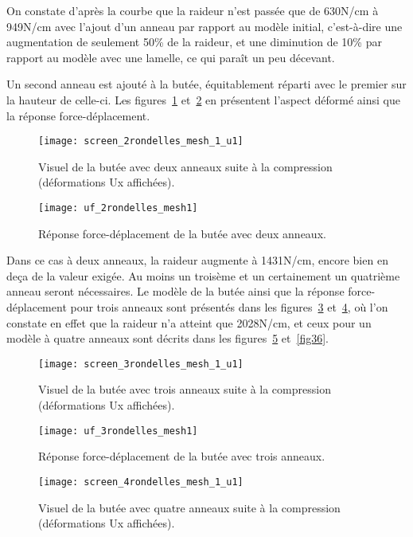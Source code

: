 ﻿\documentclass{article}
\newcommand{\cimg}{0.8}
\begin{document}
On constate d'après la courbe que la raideur n'est passée que de 630N/cm à 949N/cm avec l'ajout d'un anneau par rapport au modèle initial, c'est-à-dire une augmentation de seulement 50\% de la raideur, et une diminution de 10\% par rapport au modèle avec une lamelle, ce qui paraît un peu décevant.

Un second anneau est ajouté à la butée, équitablement réparti avec le premier sur la hauteur de celle-ci. Les figures~\ref{fig31} et~\ref{fig32} en présentent l'aspect déformé ainsi que la réponse force-déplacement.

\begin{figure}[!h]
	\centering
	\texttt{[image: screen\_2rondelles\_mesh\_1\_u1]}
	\caption{Visuel de la butée avec deux anneaux suite à la compression (déformations Ux affichées).}
	\label{fig31}
\end{figure}

\begin{figure}[!h]
	\centering
	\texttt{[image: uf\_2rondelles\_mesh1]}
	\caption{Réponse force-déplacement de la butée avec deux anneaux.}
	\label{fig32}
\end{figure}

Dans ce cas à deux anneaux, la raideur augmente à 1431N/cm, encore bien en deça de la valeur exigée. Au moins un troisème et un certainement un quatrième anneau seront nécessaires. Le modèle de la butée ainsi que la réponse force-déplacement pour trois anneaux sont présentés dans les figures~\ref{fig33} et~\ref{fig34}, où l'on constate en effet que la raideur n'a atteint que 2028N/cm, et ceux pour un modèle à quatre anneaux sont décrits dans les figures~\ref{fig35} et~\ref{fig36}.

\begin{figure}[!h]
	\centering
	\texttt{[image: screen\_3rondelles\_mesh\_1\_u1]}
	\caption{Visuel de la butée avec trois anneaux suite à la compression (déformations Ux affichées).}
	\label{fig33}
\end{figure}

\begin{figure}[!h]
	\centering
	\texttt{[image: uf\_3rondelles\_mesh1]}
	\caption{Réponse force-déplacement de la butée avec trois anneaux.}
	\label{fig34}
\end{figure}

\begin{figure}[!h]
	\centering
	\texttt{[image: screen\_4rondelles\_mesh\_1\_u1]}
	\caption{Visuel de la butée avec quatre anneaux suite à la compression (déformations Ux affichées).}
	\label{fig35}
\end{figure}
\end{document}
